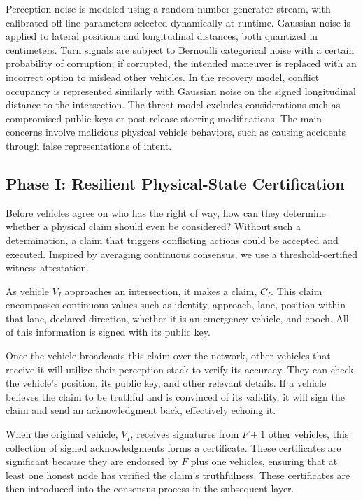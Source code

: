 \documentclass[letterpaper,10pt,conference]{IEEEtran}
\begin{document}
Perception noise is modeled using a random number generator stream, with calibrated off-line parameters selected dynamically at runtime. Gaussian noise is applied to lateral positions and longitudinal distances, both quantized in centimeters. Turn signals are subject to Bernoulli categorical noise with a certain probability of corruption; if corrupted, the intended maneuver is replaced with an incorrect option to mislead other vehicles. In the recovery model, conflict occupancy is represented similarly with Gaussian noise on the signed longitudinal distance to the intersection. The threat model excludes considerations such as compromised public keys or post-release steering modifications. The main concerns involve malicious physical vehicle behaviors, such as causing accidents through false representations of intent.



\subsection{Phase I: Resilient Physical-State Certification}
\label{sec:phase1}


Before vehicles agree on who has the right of way, how can they determine whether a physical claim should even be considered? Without such a determination, a claim that triggers conflicting actions could be accepted and executed. Inspired by averaging continuous consensus, we use a threshold-certified witness attestation. 

 As vehicle $V_I$ approaches an intersection, it makes a claim, $C_I$. This claim encompasses continuous values such as identity, approach, lane, position within that lane, declared direction, whether it is an emergency vehicle, and epoch. All of this information is signed with its public key.
 

Once the vehicle broadcasts this claim over the network, other vehicles that receive it will utilize their perception stack to verify its accuracy. They can check the vehicle's position, its public key, and other relevant details. If a vehicle believes the claim to be truthful and is convinced of its validity, it will sign the claim and send an acknowledgment back, effectively echoing it. 

When the original vehicle, $V_I$, receives signatures from $F +1$ other vehicles, this collection of signed acknowledgments forms a certificate. These certificates are significant because they are endorsed by $F$ plus one vehicles, ensuring that at least one honest node has verified the claim's truthfulness. These certificates are then introduced into the consensus process in the subsequent layer.
\end{document}
